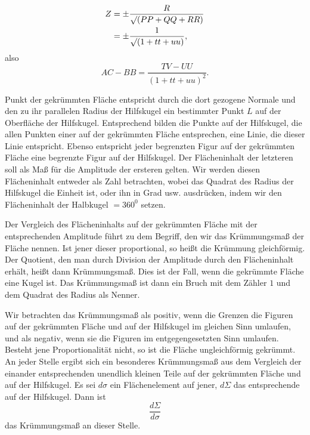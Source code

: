 %
\[
\begin{aligned}
Z&=\pm\frac{R}{\mathord{\surd}(PP+QQ+RR)}\\
&=\pm\frac{1}{\mathord{\surd}(1+tt+uu)},
\end{aligned}
\]
also
\[
AC-BB=\frac{TV-UU}{(1+tt+uu)^{2}}.
\]

 Punkt der gekrümmten Fläche entspricht durch die dort gezogene Normale und den zu ihr parallelen Radius der Hilfskugel ein bestimmter Punkt $L$ auf der Oberfläche der Hilfskugel. Entsprechend bilden die Punkte auf der Hilfskugel, die allen Punkten einer  auf der gekrümmten Fläche entsprechen, eine Linie, die dieser Linie entspricht. Ebenso entspricht jeder begrenzten Figur auf der gekrümmten Fläche eine begrenzte Figur auf der Hilfskugel. Der Flächeninhalt der letzteren soll als Maß für die Amplitude der ersteren gelten. Wir werden diesen Flächeninhalt entweder als Zahl betrachten, wobei das Quadrat des Radius der Hilfskugel die Einheit ist, oder ihn in Grad usw. ausdrücken, indem wir den Flächeninhalt der Halbkugel $=360^{0}$ setzen.

Der Vergleich des Flächeninhalts auf der gekrümmten Fläche mit der entsprechenden Amplitude führt zu dem Begriff, den wir das Krümmungsmaß der Fläche nennen. Ist jener dieser proportional, so heißt die Krümmung gleichförmig. Der Quotient, den man durch Division der Amplitude durch den Flächeninhalt erhält, heißt dann Krümmungsmaß. Dies ist der Fall, wenn die gekrümmte Fläche eine Kugel ist. Das Krümmungsmaß ist dann ein Bruch mit dem Zähler $1$ und dem Quadrat des Radius als Nenner.

Wir betrachten das Krümmungsmaß als positiv, wenn die Grenzen die Figuren auf der gekrümmten Fläche und auf der Hilfskugel im gleichen Sinn umlaufen, und als negativ, wenn sie die Figuren im entgegengesetzten Sinn umlaufen. Besteht jene Proportionalität nicht, so ist die Fläche ungleichförmig gekrümmt. An jeder Stelle ergibt sich ein besonderes Krümmungsmaß aus dem Vergleich der einander entsprechenden unendlich kleinen Teile auf der gekrümmten Fläche und auf der Hilfskugel. Es sei $d\sigma$ ein Flächenelement auf jener, $d\Sigma$ das entsprechende auf der Hilfskugel. Dann ist
\[
\frac{d\Sigma}{d\sigma}
\]
das Krümmungsmaß an dieser Stelle.
